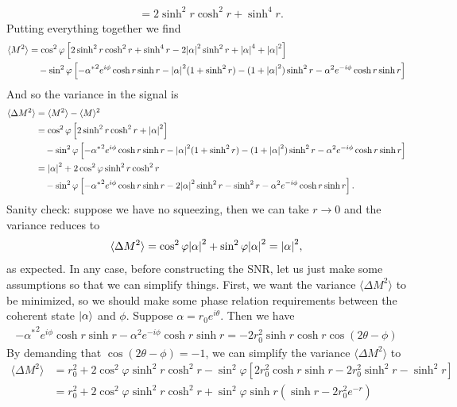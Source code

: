 \documentclass{article}
\theoremstyle{definition}
\newcommand{\al}{\alpha}
\newcommand{\lb}{\left[}
\newcommand{\rb}{\right]}
\begin{document}
\begin{enumerate}[label=(\alph*)]
\begin{align*}
&= 2 \sinh^2 r \cosh^2 r + \sinh^4 r.
\end{align*}
Putting everything together we find 
\begin{align*}
\langle M^2 \rangle 
&= \cos^2 \varphi 
\lb 2 \sinh^2 r \cosh^2 r + \sinh^4 r - 2 \abs{\al}^2\sinh^2 r + \abs{\al}^4 + \abs{\al}^2  \rb \\ 
&\quad - \sin^2 \varphi \lb -{\al^*}^2 e^{i\phi} \cosh r \sinh r - \abs{\al}^2(1 + \sinh^2 r) - (1+\abs{\al}^2)\sinh^2 r 
- \al^2  e^{-i\phi} \cosh r \sinh r    \rb
\end{align*}
And so the variance in the signal is 
\begin{align*}
\langle \Delta M^2 \rangle 
&= \langle M^2 \rangle - \langle M\rangle^2 \\
&= \cos^2 \varphi 
\lb 2 \sinh^2 r \cosh^2 r + \abs{\al}^2  \rb \\ 
&\quad - \sin^2 \varphi \lb -{\al^*}^2 e^{i\phi} \cosh r \sinh r - \abs{\al}^2(1 + \sinh^2 r) - (1+\abs{\al}^2)\sinh^2 r 
- \al^2  e^{-i\phi} \cosh r \sinh r    \rb \\
&= \abs{\al}^2 +  2\cos^2 \varphi \sinh^2 r \cosh^2 r   \\ 
&\quad - \sin^2 \varphi \lb -{\al^*}^2 e^{i\phi} \cosh r \sinh r - 2\abs{\al}^2 \sinh^2 r - \sinh^2 r 
- \al^2  e^{-i\phi} \cosh r \sinh r    \rb.
\end{align*}
Sanity check: suppose we have no squeezing, then we can take $r\to 0$ and the variance reduces to 
\begin{align*}
\langle \Delta M^2 \rangle = \cos^2 \varphi \abs{\al}^2 + \sin^2 \varphi \abs{\al}^2 = \abs{\al}^2,
\end{align*}
as expected. In any case, before constructing the SNR, let us just make some assumptions so that we can simplify things. First, we want the variance $\langle \Delta M^2 \rangle$ to be minimized, so we should make some phase relation requirements between the coherent state $\ket{\al}$ and $\phi$. Suppose $\al = r_0 e^{i\theta}$. Then we have
\begin{align*}
-{\al^*}^2 e^{i\phi} \cosh r \sinh r - \al^2 e^{-i\phi}\cosh r \sinh r 
= -2 r_0^2 \sinh r \cosh r \cos (2\theta - \phi)
\end{align*}
By demanding that $\cos(2\theta - \phi) = -1$, we can simplify the variance $\langle \Delta M^2 \rangle$ to 
\begin{align*}
\langle \Delta M^2 \rangle 
&= r_0^2 +  2\cos^2 \varphi \sinh^2 r \cosh^2 r   - \sin^2 \varphi \lb 2r_0^2  \cosh r \sinh r - 2r_0^2  \sinh^2 r - \sinh^2 r    \rb\\
&=  r_0^2 +  2\cos^2 \varphi \sinh^2 r \cosh^2 r   +  \sin^2 \varphi \sinh r (\sinh r  - 2r_0^2 e^{-r})
\end{align*}


\end{enumerate}
\end{document}
